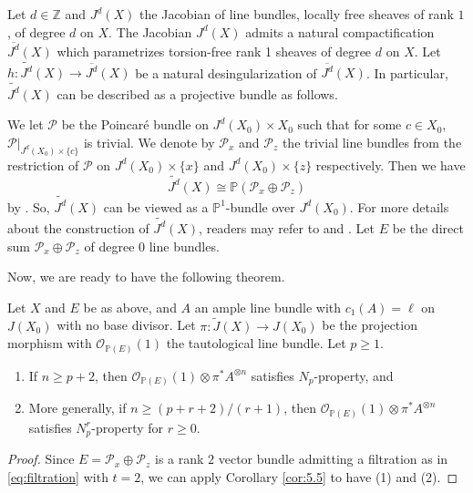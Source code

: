 \documentclass[11pt,letter]{amsart}
\numberwithin{equation}{section}
\begin{document}
Let $d\in \mathbb{Z}$ and $J^d(X)$ the Jacobian of line bundles, locally free sheaves of rank $1$, of degree $d$ on $X$. The Jacobian $J^d(X)$ admits a natural compactification $\overline{J^d}(X)$ which parametrizes torsion-free rank 1 sheaves of degree $d$ on $X$. Let $h:\widetilde{J^d}(X)\rightarrow\overline{J^d}(X)$ be a natural desingularization of $\overline{J^d}(X)$. 
In particular, $\widetilde{J^d}(X)$ can be described as a projective bundle as follows.


We let $\mathcal{P}$ be the Poincar\'{e} bundle on $J^d(X_0)\times X_0$ such that for some $c\in X_0$,
$\mathcal{P}|_{J^d(X_0)\times\{c\}}$ is trivial. We denote by $\mathcal{P}_{x}$ and $\mathcal{P}_{z}$ the trivial line bundles from the restriction of $\mathcal{P}$ on $J^d(X_0)\times\{x\}$ and $J^d(X_0)\times\{z\}$ respectively. Then we have
\[
\widetilde{J^d}(X)\cong\mathbb{P}(\mathcal{P}_x\oplus\mathcal{P}_z)
\]
by \cite[Proposition 2.1]{BP08}. So, $\widetilde{J^d}(X)$ can be viewed as a $\mathbb{P}^1$-bundle over $J^d(X_0)$. For more details about the construction of $\widetilde{J^d}(X)$, readers may refer to \cite{BP08} and \cite[Proposition 12.1]{OS79}.
Let $E$ be the direct sum $\mathcal{P}_x\oplus\mathcal{P}_z$ of degree $0$ line bundles. 

%

Now, we are ready to have the following theorem. 
\begin{thm}
Let $X$ and $E$ be as above, and $A$ an ample line bundle with ${c}_1(A)=\ell$ on $J(X_0)$ with no base divisor. Let $\pi:\widetilde{J}(X)\rightarrow J(X_0)$ be the projection morphism with $\mathcal{O}_{\mathbb{P}(E)}(1)$ the tautological line bundle.  Let $p\geq 1$.

\begin{enumerate}
\item If $n\geq p+2$, then $\mathcal{O}_{\mathbb{P}(E)}(1)\otimes\pi^*A^{\otimes n}$ satisfies $N_p$-property, and
\item More generally, if $n\geq (p+r+2)/(r+1)$, then $\mathcal{O}_{\mathbb{P}(E)}(1)\otimes\pi^*A^{\otimes n}$ satisfies $N_p^r$-property for $r\geq 0$. \end{enumerate}
\end{thm}
\begin{proof}
Since $E=\mathcal{P}_x\oplus\mathcal{P}_z$ is a rank $2$ vector bundle admitting a filtration as in \eqref{eq:filtration} with $t=2$, we can apply Corollary \ref{cor:5.5} to have (1) and (2).
\end{proof}
\end{document}

